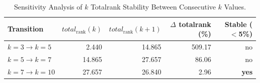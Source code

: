 \begin{table}[ht]
\centering
\footnotesize
\caption{Sensitivity Analysis of $k$ Totalrank Stability Between Consecutive $k$ Values.}
\label{tab:k_sensitivity_k_stability}
\begin{tabular}{@{}lrrrr@{}}
\hline
    Transition & $total_{\text{rank}}(k)$ & $total_{\text{rank}}(k{+}1)$ & $\Delta$ totalrank (\%) & Stable ($<$5\%) \\
\hline
    $k=3 \rightarrow k=5$ & 2.440 & 14.865 & 509.17 & no \\
    $k=5 \rightarrow k=7$ & 14.865 & 27.657 & 86.06 & no \\
    $k=7 \rightarrow k=10$ & 27.657 & 26.840 & 2.96 & \textbf{yes} \\
\hline
\end{tabular}
\end{table}
